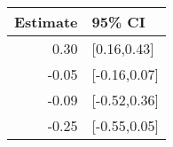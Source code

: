 \begin{tabular}{rl}
  \hline
Estimate & 95\% CI \\ 
  \hline
0.30 & [0.16,0.43] \\ 
  -0.05 & [-0.16,0.07] \\ 
  -0.09 & [-0.52,0.36] \\ 
  -0.25 & [-0.55,0.05] \\ 
   \hline
\end{tabular}

